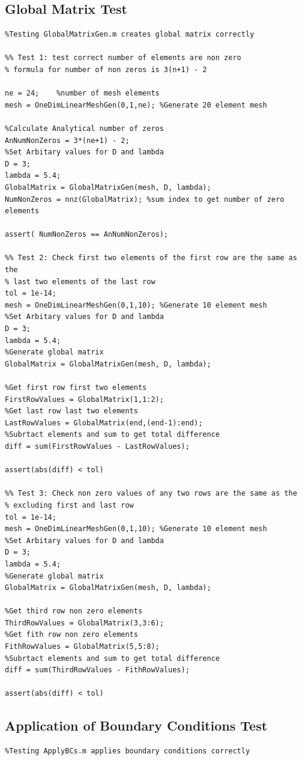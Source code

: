 \documentclass[11pt]{article}
\begin{document}
\begin{appendices}
\subsection{Global Matrix Test}
\begin{lstlisting}
%Testing GlobalMatrixGen.m creates global matrix correctly

%% Test 1: test correct number of elements are non zero
% formula for number of non zeros is 3(n+1) - 2

ne = 24;    %number of mesh elements
mesh = OneDimLinearMeshGen(0,1,ne); %Generate 20 element mesh

%Calculate Analytical number of zeros
AnNumNonZeros = 3*(ne+1) - 2;
%Set Arbitary values for D and lambda
D = 3;
lambda = 5.4;
GlobalMatrix = GlobalMatrixGen(mesh, D, lambda);
NumNonZeros = nnz(GlobalMatrix); %sum index to get number of zero elements

assert( NumNonZeros == AnNumNonZeros);

%% Test 2: Check first two elements of the first row are the same as the 
% last two elements of the last row
tol = 1e-14;
mesh = OneDimLinearMeshGen(0,1,10); %Generate 10 element mesh
%Set Arbitary values for D and lambda
D = 3;
lambda = 5.4;
%Generate global matrix
GlobalMatrix = GlobalMatrixGen(mesh, D, lambda);

%Get first row first two elements
FirstRowValues = GlobalMatrix(1,1:2);
%Get last row last two elements
LastRowValues = GlobalMatrix(end,(end-1):end);
%Subrtact elements and sum to get total difference
diff = sum(FirstRowValues - LastRowValues);

assert(abs(diff) < tol) 

%% Test 3: Check non zero values of any two rows are the same as the 
% excluding first and last row
tol = 1e-14;
mesh = OneDimLinearMeshGen(0,1,10); %Generate 10 element mesh
%Set Arbitary values for D and lambda
D = 3;
lambda = 5.4;
%Generate global matrix
GlobalMatrix = GlobalMatrixGen(mesh, D, lambda);

%Get third row non zero elements
ThirdRowValues = GlobalMatrix(3,3:6);
%Get fith row non zero elements
FithRowValues = GlobalMatrix(5,5:8);
%Subrtact elements and sum to get total difference
diff = sum(ThirdRowValues - FithRowValues);

assert(abs(diff) < tol)
\end{lstlisting}

\subsection{Application of Boundary Conditions Test}
\begin{lstlisting}
%Testing ApplyBCs.m applies boundary conditions correctly


\end{lstlisting}
\end{appendices}
\end{document}
